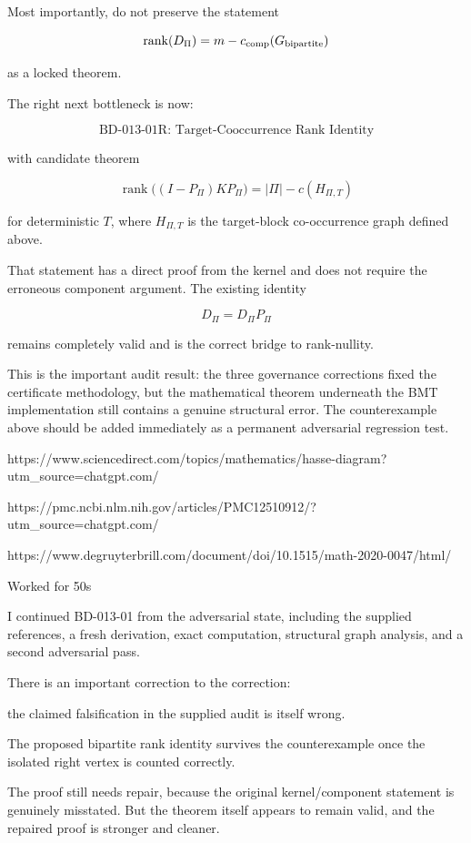 Most importantly, do not preserve the statement

\[
\operatorname{rank}(D_\Pi)=m-c_{\rm comp}(G_{\rm bipartite})  
\]

as a locked theorem.

The right next bottleneck is now:

\[
\boxed{\text{BD-013-01R: Target-Cooccurrence Rank Identity}}  
\]

with candidate theorem

\[
\boxed{  
\operatorname{rank}\big((I-P_\Pi)KP_\Pi\big)  
=  
|\Pi|-c(H_{\Pi,T})  
}  
\]

for deterministic \(T\), where \(H_{\Pi,T}\) is the target-block co-occurrence graph defined above.

That statement has a direct proof from the kernel and does not require the erroneous component argument. The existing identity

\[
D_\Pi=D_\Pi P_\Pi  
\]

remains completely valid and is the correct bridge to rank-nullity.

This is the important audit result: the three governance corrections fixed the certificate methodology, but the mathematical theorem underneath the BMT implementation still contains a genuine structural error. The counterexample above should be added immediately as a permanent adversarial regression test.

https://www.sciencedirect.com/topics/mathematics/hasse-diagram?utm_source=chatgpt.com/

https://pmc.ncbi.nlm.nih.gov/articles/PMC12510912/?utm_source=chatgpt.com/

https://www.degruyterbrill.com/document/doi/10.1515/math-2020-0047/html/

Worked for 50s

I continued BD-013-01 from the adversarial state, including the supplied references, a fresh derivation, exact computation, structural graph analysis, and a second adversarial pass.

There is an important correction to the correction:

the claimed falsification in the supplied audit is itself wrong.

The proposed bipartite rank identity survives the counterexample once the isolated right vertex is counted correctly.

The proof still needs repair, because the original kernel/component statement is genuinely misstated. But the theorem itself appears to remain valid, and the repaired proof is stronger and cleaner.


